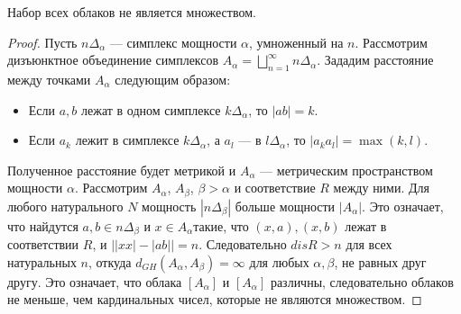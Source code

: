 \begin{theorem}
   Набор всех облаков не является множеством.
\end{theorem}
\begin{proof}
Пусть $n\Delta_\alpha$ --- симплекс мощности $\alpha$, умноженный на $n$. Рассмотрим дизъюнктное
объединение симплексов $A_\alpha = \bigsqcup_{n=1}^\infty n\Delta_\alpha$.
Зададим расстояние между точками $A_{\alpha}$ следующим образом:
\begin{itemize}
  \item Если $a, b$ лежат в одном симплексе $k\Delta_{\alpha}$, то $|ab| = k$.
  \item Если $a_{k}$ лежит в симплексе $k\Delta_{\alpha}$, а $a_{l}$ --- в $l\Delta_{\alpha}$,
        то $|a_{k} a_{l}| = \max(k,l)$.
\end{itemize}
Полученное расстояние будет метрикой и $A_\alpha$ --- метрическим пространством
мощности $\alpha$. Рассмотрим $A_\alpha$, $A_\beta$, $\beta>\alpha$ и
соответствие $R$ между ними. Для любого натурального $N$
мощность $|n\Delta_\beta|$ больше мощности $|A_\alpha|$. Это означает,
что найдутся  $a, b \in n\Delta_\beta$ и $x\in A_\alpha$такие, что
$(x,a), (x,b)$ лежат в соответствии $R$, и
$\big||xx| - |ab|\big| = n$. Следовательно $disR > n$ для всех натуральных
$n$, откуда
$d_{GH}(A_\alpha, A_\beta) = \infty$ для любых $\alpha, \beta$, не равных друг другу.
Это означает, что облака $\left[A_{\alpha}\right]$ и $\left[A_{\alpha}\right]$
различны, следовательно облаков не меньше, чем кардинальных чисел,
 которые не являются множеством.
\end{proof}
